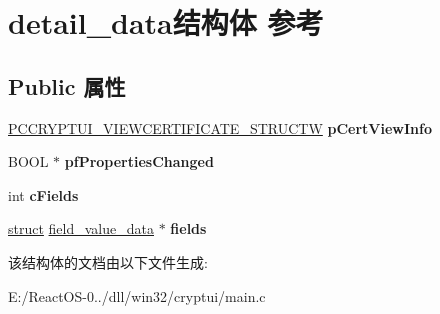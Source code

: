 \hypertarget{structdetail__data}{}\section{detail\+\_\+data结构体 参考}
\label{structdetail__data}
\subsection*{Public 属性}
\begin{DoxyCompactItemize}
\item 
\mbox{\label{structdetail__data_aea6432e21bbd0829871aa51e537dab98}} 
\hyperlink{structtag_c_r_y_p_t_u_i___v_i_e_w_c_e_r_t_i_f_i_c_a_t_e___s_t_r_u_c_t_w}{P\+C\+C\+R\+Y\+P\+T\+U\+I\+\_\+\+V\+I\+E\+W\+C\+E\+R\+T\+I\+F\+I\+C\+A\+T\+E\+\_\+\+S\+T\+R\+U\+C\+TW} {\bfseries p\+Cert\+View\+Info}
\item 
\mbox{\label{structdetail__data_a23e872d00d697bf8645057eb715853b9}} 
B\+O\+OL $\ast$ {\bfseries pf\+Properties\+Changed}
\item 
\mbox{\label{structdetail__data_a1e9bf09aaf07d42059c695b78965e96c}} 
int {\bfseries c\+Fields}
\item 
\mbox{\label{structdetail__data_a78586362dadbf3cfa3641f978de9e49f}} 
\hyperlink{interfacestruct}{struct} \hyperlink{structfield__value__data}{field\+\_\+value\+\_\+data} $\ast$ {\bfseries fields}
\end{DoxyCompactItemize}


该结构体的文档由以下文件生成\+:\begin{DoxyCompactItemize}
\item 
E\+:/\+React\+O\+S-\/0../dll/win32/cryptui/main.\+c\end{DoxyCompactItemize}
